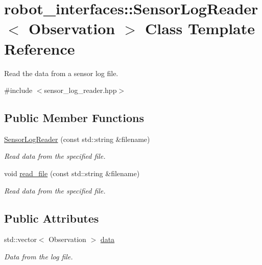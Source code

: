 \hypertarget{classrobot__interfaces_1_1SensorLogReader}{}\section{robot\+\_\+interfaces\+:\+:Sensor\+Log\+Reader$<$ Observation $>$ Class Template Reference}
\label{classrobot__interfaces_1_1SensorLogReader}


Read the data from a sensor log file.  




{\ttfamily \#include $<$sensor\+\_\+log\+\_\+reader.\+hpp$>$}

\subsection*{Public Member Functions}
\begin{DoxyCompactItemize}
\item 
\hyperlink{classrobot__interfaces_1_1SensorLogReader_af98cfbebee2e96b24dcba44dff27b783}{Sensor\+Log\+Reader} (const std\+::string \&filename)
\begin{DoxyCompactList}\small\item\em Read data from the specified file. \end{DoxyCompactList}\item 
void \hyperlink{classrobot__interfaces_1_1SensorLogReader_a2632219304890e40ff770b1dfef72e6c}{read\+\_\+file} (const std\+::string \&filename)
\begin{DoxyCompactList}\small\item\em Read data from the specified file. \end{DoxyCompactList}\end{DoxyCompactItemize}
\subsection*{Public Attributes}
\begin{DoxyCompactItemize}
\item 
\mbox{\label{classrobot__interfaces_1_1SensorLogReader_ae9bc7102e1de64979d2937f465eea9cc}} 
std\+::vector$<$ Observation $>$ \hyperlink{classrobot__interfaces_1_1SensorLogReader_ae9bc7102e1de64979d2937f465eea9cc}{data}
\begin{DoxyCompactList}\small\item\em Data from the log file. \end{DoxyCompactList}\end{DoxyCompactItemize}


